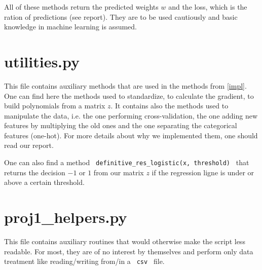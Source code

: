 \documentclass[11pt, oneside]{article}   	%
\begin{document}
All of these methods return the predicted weights $w$ and the loss, which is the ration of predictions (see report). They are to be used cautiously and basic knowledge in machine learning is assumed.

\section{utilities.py}

This file contains auxiliary methods that are used in the methods from \ref{impl}. One can find here the methods used to standardize, to calculate the gradient, to build polynomials from a matrix $z$. It contains also the methods used to manipulate the data, i.e. the one performing cross-validation, the one adding new features by multiplying the old ones and the one separating the categorical features (one-hot). For more details about why we implemented them, one should read our report.

One can also find a method \lstinline" definitive_res_logistic(x, threshold) " that returns the decision $-1$ or $1$ from our matrix $z$ if the regression ligne is under or above a certain threshold.

\section{proj1\_helpers.py}

This file contains auxiliary routines that would otherwise make the script less readable. For most, they are of no interest by themselves and perform only data treatment like reading/writing from/in a \lstinline" csv " file.
\end{document}
